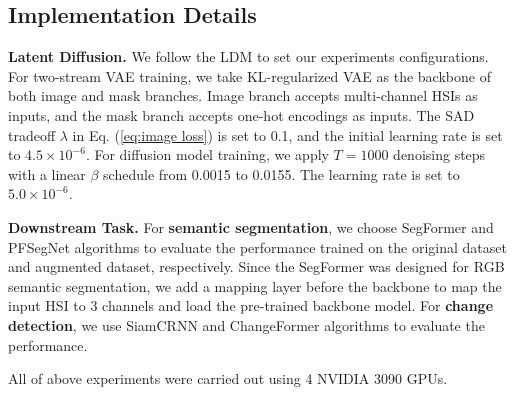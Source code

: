 \subsection{Implementation Details}
\noindent
\textbf{Latent Diffusion.} We follow the LDM \cite{ldm} to set our experiments configurations. For two-stream VAE training, we take KL-regularized VAE as the backbone of both image and mask branches. Image branch accepts multi-channel HSIs as inputs, and the mask branch accepts one-hot encodings as inputs.
The SAD tradeoff $\lambda$ in Eq. (\ref{eq:image loss})  is set to 0.1, and the initial learning rate is set to $4.5\times 10^{-6}$. For diffusion model training, we apply $T=1000$ denoising steps with a linear $\beta$ schedule from 0.0015 to 0.0155. The learning rate is set to $5.0\times 10^{-6}$.

\noindent
\textbf{Downstream Task.} For \textbf{semantic segmentation}, we choose SegFormer \cite{segformer} and PFSegNet \cite{pfsegnet} algorithms to evaluate the performance trained on the original dataset and augmented dataset, respectively. Since the SegFormer was designed for RGB semantic segmentation, we add a mapping layer before the backbone to map the input HSI to 3 channels and load the pre-trained backbone model. For \textbf{change detection}, we use SiamCRNN \cite{siamcrnn} and ChangeFormer \cite{changeformer} algorithms to evaluate the performance.

All of above experiments were carried out using 4 NVIDIA 3090 GPUs.